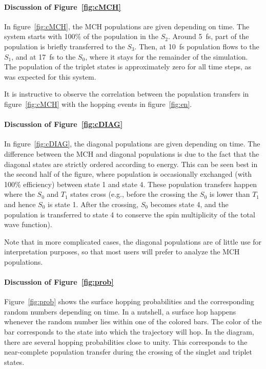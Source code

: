 \documentclass[a4paper,11pt,DIV=15,openany]{scrbook}
\begin{document}
\paragraph{Discussion of Figure~\ref{fig:cMCH}}

In figure~\ref{fig:cMCH}, the MCH populations are given depending on time. The system starts with 100\% of the population in the $S_2$. 
Around 5~fs, part of the population is briefly transferred to the $S_3$.
Then, at 10~fs population flows to the $S_1$, and at 17~fs to the $S_0$, where it stays for the remainder of the simulation.
The population of the triplet states is approximately zero for all time steps, as was expected for this system.

It is instructive to observe the correlation between the population transfers in figure~\ref{fig:cMCH} with the hopping events in figure~\ref{fig:en}.


\paragraph{Discussion of Figure~\ref{fig:cDIAG}}

In figure~\ref{fig:cDIAG}, the diagonal populations are given depending on time. 
The difference between the MCH and diagonal populations is due to the fact that the diagonal states are strictly ordered according to energy.
This can be seen best in the second half of the figure, where population is occasionally exchanged (with 100\% efficiency) between state 1 and state 4.
These population transfers happen where the $S_0$ and $T_1$ states cross (e.g., before the crossing the $S_0$ is lower than $T_1$ and hence $S_0$ is state 1. After the crossing, $S_0$ becomes state 4, and the population is transferred to state 4 to conserve the spin multiplicity of the total wave function).

Note that in more complicated cases, the diagonal populations are of little use for interpretation purposes, so that most users will prefer to analyze the MCH populations.


\paragraph{Discussion of Figure~\ref{fig:prob}}

Figure~\ref{fig:prob} shows the surface hopping probabilities and the corresponding random numbers depending on time.
In a nutshell, a surface hop happens whenever the random number lies within one of the colored bars. 
The color of the bar corresponds to the state into which the trajectory will hop. 
In the diagram, there are several hopping probabilities close to unity. 
This corresponds to the near-complete population transfer during the crossing of the singlet and triplet states. 
\end{document}
